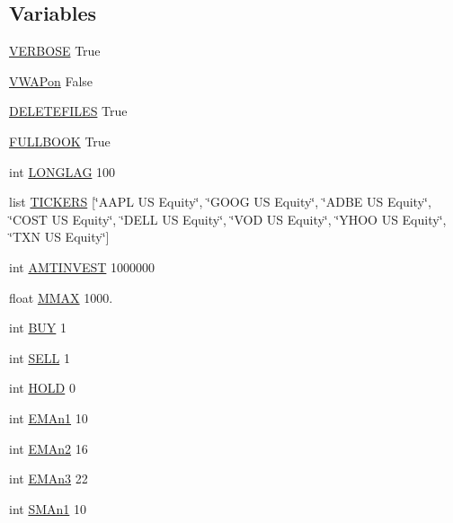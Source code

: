 \subsection*{Variables}
\begin{DoxyCompactItemize}
\item 
\hyperlink{namespaceparameters_af1f97ce3a2cf803229f0da0030df57c4}{V\-E\-R\-B\-O\-S\-E} True
\item 
\hyperlink{namespaceparameters_a2c63de9d65f20764dd2f4d2466f66b21}{V\-W\-A\-Pon} False
\item 
\hyperlink{namespaceparameters_adddd18efc8e475f14caf20c4ccf97f65}{D\-E\-L\-E\-T\-E\-F\-I\-L\-E\-S} True
\item 
\hyperlink{namespaceparameters_a83df07d0b88ebc148a873b57b15bf442}{F\-U\-L\-L\-B\-O\-O\-K} True
\item 
int \hyperlink{namespaceparameters_ab7eecb25a17a0bf552dc7e0a8e2a4f6a}{L\-O\-N\-G\-L\-A\-G} 100
\item 
list \hyperlink{namespaceparameters_a5f32980dc20bf108bea82bedffc53f08}{T\-I\-C\-K\-E\-R\-S} \mbox{[}\char`\"{}A\-A\-P\-L U\-S Equity\char`\"{}, \char`\"{}G\-O\-O\-G U\-S Equity\char`\"{}, \char`\"{}A\-D\-B\-E U\-S Equity\char`\"{}, \char`\"{}C\-O\-S\-T U\-S Equity\char`\"{}, \char`\"{}D\-E\-L\-L U\-S Equity\char`\"{}, \char`\"{}V\-O\-D U\-S Equity\char`\"{}, \char`\"{}Y\-H\-O\-O U\-S Equity\char`\"{}, \char`\"{}T\-X\-N U\-S Equity\char`\"{}\mbox{]}
\item 
int \hyperlink{namespaceparameters_a935132dfc888d45f24341f8b7693fab6}{A\-M\-T\-I\-N\-V\-E\-S\-T} 1000000
\item 
float \hyperlink{namespaceparameters_acc8dce6dc10ab6d47a95fcc1c95875c6}{M\-M\-A\-X} 1000.
\item 
int \hyperlink{namespaceparameters_a78f29cfbf5e7e434a9f1f875dd21b5d8}{B\-U\-Y} 1
\item 
int \hyperlink{namespaceparameters_afc0e08b1e70b5364b401f724e19aaf7f}{S\-E\-L\-L} 1
\item 
int \hyperlink{namespaceparameters_ab7ffc289e7c0fa03d3de298794cf221c}{H\-O\-L\-D} 0
\item 
int \hyperlink{namespaceparameters_abb05806f549690e9adc2a7e6af361638}{E\-M\-An1} 10
\item 
int \hyperlink{namespaceparameters_acf024a8093ba04f65e089646d672a967}{E\-M\-An2} 16
\item 
int \hyperlink{namespaceparameters_ae3c3839de636318ee4774a193c7169b3}{E\-M\-An3} 22
\item 
int \hyperlink{namespaceparameters_af58d8069092f06fec36c6bed4b6356b3}{S\-M\-An1} 10

\end{DoxyCompactItemize}
